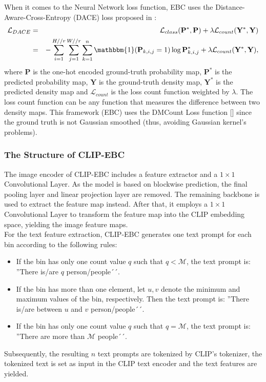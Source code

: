 When it comes to the Neural Network loss function, EBC uses the Distance-Aware-Cross-Entropy (DACE) loss proposed in \cite{CLIP}:
\begin{eqnarray}\label{loss}
\mathcal{L}_{DACE} & = & \mathcal{L}_{class}(\mathbf{P}^*,\mathbf{P}) + \lambda \mathcal{L}_{count}(\mathbf{Y}^*,\mathbf{Y}) \\
             & = & - \sum_{i=1}^{H//r}\sum_{j=1}^{W//r}\sum_{k=1}^{n} \mathbbm{1}(\mathbf{P}_{k,i,j} = 1) \log{\mathbf{P}_{k,i,j}^*} + \lambda \mathcal{L}_{count}(\mathbf{Y}^*,\mathbf{Y}),
\end{eqnarray} 
where $\mathbf{P}$ is the one-hot encoded ground-truth probability map, $\mathbf{P}^*$ is the predicted probability map, $\mathbf{Y}$ is the ground-truth density map, $\mathbf{Y}^*$ is the predicted density map and $\mathcal{L}_{count}$ is the loss count function weighted by $\lambda$. The loss count function can be any function that measures the difference between two density maps. This framework (EBC) uses the DMCount Loss function [\cite{DMCount}] since the ground truth is not Gaussian smoothed (thus, avoiding Gaussian kernel's problems).\\

\subsubsection{The Structure of CLIP-EBC}
The image encoder of CLIP-EBC includes a feature extractor and a $1\times 1$ Convolutional Layer. As the model is based on blockwise prediction, the final pooling layer and linear projection layer are removed. The remaining backbone is used to extract the feature map instead. After that, it employs a $1\times 1$ Convolutional Layer to transform the feature map into the CLIP embedding space, yielding the image feature maps.\\

For the text feature extraction, CLIP-EBC generates one text prompt for each bin according to the following rules:
\begin{itemize}
    \item If the bin has only one count value $q$ such that $q<\mathcal{M}$, the text prompt is: ''There is/are $q$ person/people´´.
    \item If the bin has more than one element, let $u,v$ denote the minimum and maximum values of the bin, respectively. Then the text prompt is: ''There is/are between $u$ and $v$ person/people´´.
    \item If the bin has only one count value $q$ such that $q=\mathcal{M}$, the text prompt is: ''There are more than $\mathcal{M}$ people´´.
\end{itemize}
Subsequently, the resulting $n$ text prompts are tokenized by CLIP's tokenizer, the tokenized text is set as input in the CLIP text encoder and the text features are yielded.\\

